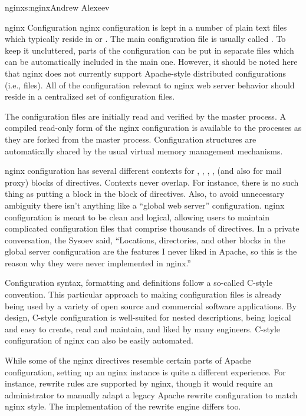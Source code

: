 \begin{aosachapter}{nginx}{s:nginx}{Andrew Alexeev}
\begin{aosasect1}{nginx Configuration}
nginx configuration is kept in a number of plain text files which
typically reside in  or
. The main configuration file is usually called
. To keep it uncluttered, parts of the configuration
can be put in separate files which can be automatically included in
the main one. However, it should be noted here that nginx does not
currently support Apache-style distributed configurations (i.e.,
 files). All of the configuration relevant to nginx
web server behavior should reside in a centralized set of
configuration files.

The configuration files are initially read and verified by the master
process. A compiled read-only form of the nginx configuration is
available to the  processes as they are forked from the
master process. Configuration structures are automatically shared by
the usual virtual memory management mechanisms.

nginx configuration has several different contexts for ,
, , ,  (and also
 for mail proxy) blocks of directives. Contexts never
overlap. For instance, there is no such thing as putting a
 block in the  block of directives. Also, to
avoid unnecessary ambiguity there isn't anything like a ``global web
server'' configuration. nginx configuration is meant to be clean and
logical, allowing users to maintain complicated configuration files
that comprise thousands of directives. In a private conversation, the
Sysoev said, 
``Locations, directories, and other blocks in the global server
configuration are the features I never liked in Apache, so this is the
reason why they were never implemented in nginx.''

Configuration syntax, formatting and definitions follow a so-called
C-style convention. This particular approach to making configuration
files is already being used by a variety of open source and
commercial software applications. By design, C-style configuration is well-suited 
for nested descriptions, being logical and easy to create, read
and maintain, and liked by many engineers. C-style configuration of
nginx can also be easily automated.

While some of the nginx directives resemble certain parts of Apache
configuration, setting up an nginx instance is quite a different
experience. For instance, rewrite rules are supported by nginx, though
it would require an administrator to manually adapt a legacy Apache
rewrite configuration to match nginx style. The implementation of the
rewrite engine differs too.


\end{aosasect1}
\end{aosachapter}
